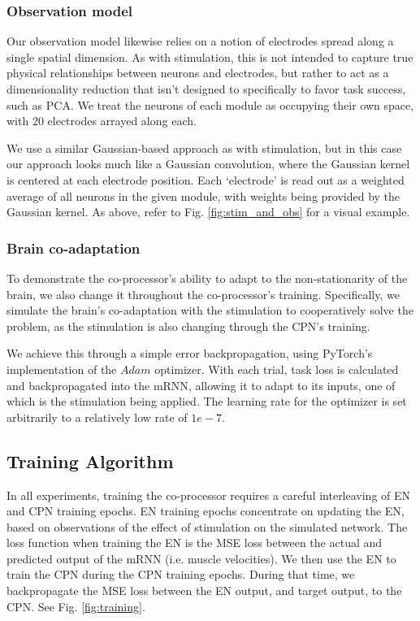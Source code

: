 \documentclass[12pt]{iopart}
\begin{document}
\subsubsection{Observation model}
Our observation model likewise relies on a notion of electrodes spread along
a single spatial dimension. As with stimulation, this is not intended to
capture true physical relationships between neurons and electrodes, but
rather to act as a dimensionality reduction that isn't designed to specifically
to favor task success, such as PCA. We treat the neurons of each module as
occupying their own space, with 20 electrodes arrayed along each.

We use a similar Gaussian-based approach as with stimulation, but in this
case our approach looks much like a Gaussian convolution, where the Gaussian
kernel is centered at each electrode position. Each `electrode' is read out
as a weighted average of all neurons in the given module, with weights being
provided by the Gaussian kernel. As above, refer to Fig. \ref{fig:stim_and_obs}
for a visual example.

\subsubsection{Brain co-adaptation}
To demonstrate the co-processor's ability to adapt to the non-stationarity
of the brain, we also change it throughout the co-processor's training.
Specifically, we simulate the brain's co-adaptation with the stimulation
to cooperatively solve the problem, as the stimulation is also changing
through the CPN's training.

We achieve this through a simple error backpropagation, using PyTorch's
implementation of the $Adam$ optimizer. With each trial, task loss is
calculated and backpropagated into the mRNN, allowing it to adapt to
its inputs, one of which is the stimulation being applied. The learning
rate for the optimizer is set arbitrarily to a relatively low rate of
$1e-7$.

\subsection{Training Algorithm}
In all experiments, training the co-processor requires a careful interleaving of
EN and CPN training epochs. EN training epochs concentrate on updating the EN,
based on observations of the effect of stimulation on the simulated network.
The loss function when training the EN is the MSE loss between the actual and
predicted output of the mRNN (i.e. muscle velocities). We then use the EN
to train the CPN during the CPN training epochs. During that time, we backpropagate
the MSE loss between the EN output, and target output, to the CPN. See Fig.
\ref{fig:training}.
\end{document}

